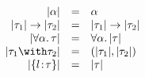 
\[
\begin{array}{rcl}
  \im \alpha                     & = & \alpha \\
  \im {\tau_1} \to \im {\tau_2} & = & \im {\tau_1} \to \im {\tau_2} \\
  \im {\for \alpha \tau}      & = & \for \alpha \im \tau \\
  \im {\tau_1 \andop \tau_2}   & = & \pair {\im {\tau_1}} {\im {\tau_2}} \\
  \im {\recty l \tau}            & = & \im \tau
\end{array}
\]